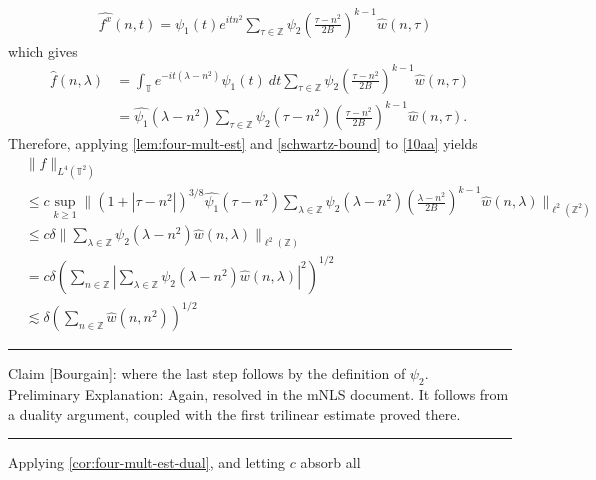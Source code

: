 \documentclass[12pt,reqno]{amsart}
\newcommand{\wh}{\widehat}
\newcommand{\zz}{\mathbb{Z}}
\newcommand{\ci}{\mathbb{T}}
\theoremstyle{plain}  %
\begin{document}
\begin{equation*}
	\begin{split}
		& \wh{f^x}(n, t) = \psi_1(t) e^{itn^2} \sum_{\tau \in \zz} 
		\psi_2\left (\frac{ \tau - n^2}{2B}\right)^{k - 1}
		\wh{w}\left( n, \tau \right)
	\end{split}
\end{equation*}
which gives
\begin{equation*}
	\begin{split}
		\wh{f}(n, \lambda)
		& = \int_\ci e^{-it\left( \lambda - n^2 \right)} 
		\psi_1(t) \ dt \sum_{\tau \in \zz} \psi_2
		\left (\frac{ \tau - n^2}{2B}\right)^{k - 1}
\wh{w}\left( n, \tau 
		\right)
		\\
		&  = \wh{\psi_1}\left( \lambda - n^2 \right) \sum_{\tau \in \zz} 
		\psi_2\left( \tau - n^2 \right)
		\left (\frac{ \tau - n^2}{2B}\right)^{k - 1}
		\wh{w} \left(n, \tau \right).
	\end{split}
\end{equation*}
%
%
Therefore, applying \autoref{lem:four-mult-est} and 
\eqref{schwartz-bound} to \eqref{10aa} yields
%
%
\begin{equation}
	\label{main-int-4-est-prelim}
	\begin{split}
		& \|f\|_{L^4(\ci^2)} 
		\\
		& \le c \sup_{k \ge 1} \|\left( 1 + |\tau - n^2| 
		\right)^{3/8} \wh{\psi_1}\left( \tau - n^2 \right) \sum_{\lambda 
		\in \zz} \psi_2\left( \lambda - n^2 \right)\left( \frac{\lambda - 
		n^2}{2B} 
		\right)^{k - 1} \wh{w}\left( n, \lambda \right) \|_{\ell^2(\zz^2)}
		\\
		& \le c \delta \| \sum_{\lambda \in \zz} 
		\psi_2\left( \lambda - n^2 \right) \wh{w}\left( n, \lambda \right)\|_{\ell^2(\zz)}
		\\
		& = c \delta \left( \sum_{n \in \zz} | 
		\sum_{\lambda \in \zz} \psi_2\left( \lambda - n^2 \right) 
		\wh{w}\left( n, \lambda \right)|^2\right)^{1/2}
		\\
		& \lesssim \delta \left( \sum_{n \in \zz} \wh{w}(n, 
		n^2) \right)^{1/2}
	\end{split}
\end{equation}
%
%
\hrule
Claim [Bourgain]: where the last step follows by the definition of 
$\psi_2$. 
\\
Preliminary Explanation: Again, resolved in the mNLS document. It follows from a 
duality argument, coupled with the first trilinear estimate proved there. \\
\hrule
Applying \autoref{cor:four-mult-est-dual}, and letting $c$ absorb all 
\end{document}
